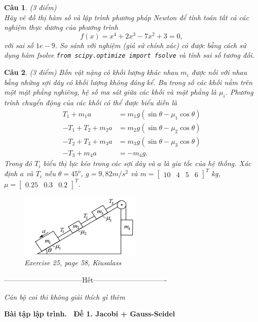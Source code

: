 \documentclass[11pt]{article}
\newtheorem{bt}{Câu}
\newcommand{\m}[1]{
	\begin{bmatrix}
		#1
	\end{bmatrix}
}
\begin{document}
\begin{bt}(3 điểm) \\
Hãy vẽ đồ thị hàm số và lập trình phương pháp Newton để tính toán tất cả các nghiệm thực dương của phương trình
\[ 
f(x) = x^4 + 2x^3 - 7x^2 + 3 = 0,
\]
với sai số $1e-9$. So sánh với nghiệm (giả sử chính xác) có được bằng cách sử dụng hàm fsolve \verb|from scipy.optimize import fsolve| và tính sai số tương đối.
\end{bt}


\begin{bt}(3 điểm)
	Bốn vật nặng có khối lượng khác nhau $m_i$ được nối với nhau bằng những sợi dây có khối lượng không đáng kể. Ba trong số các khối nằm trên một mặt phẳng nghiêng, hệ số ma sát giữa các khối và mặt phẳng là $\mu_i$. Phương trình chuyển động của các khối có thể được biểu diễn là
	\begin{align*}
		T_1 + m_1a &= m_1g (\sin \theta - \mu_1 \cos \theta) \\
		-T_1 + T_2 + m_2a &= m_2g (\sin \theta - \mu_2 \cos \theta) \\
		-T_2 + T_3 + m_3a &= m_3g (\sin \theta - \mu_3 \cos \theta) \\
		-T_3 + m_4a &= -m_4 g .
	\end{align*}
	Trong đó $T_i$ biểu thị lực kéo trong các sợi dây và $a$ là gia tốc của
	hệ thống. Xác định $a$ và $T_i$ nếu $\theta = 45^o$, $g = 9,82 m / s^2$ và
	$m = \m{10 & 4 & 5 & 6}^T$ kg, $\mu = \m{0.25 & 0.3 & 0.2}^T$.
	\begin{figure}[h!]
		\centering
		\includegraphics[width=0.4\linewidth]{mass_rope}
		\caption[]{Exercise 25, page 58, Kiusalass}
		\label{fig:massrope}
	\end{figure}
	
\end{bt}


\centerline{———————————Hết——————————-}

\vspace{1cm}
 {\it Cán bộ coi thi không giải thích gì thêm}\\

\cleardoublepage 


\begin{center}
	\textbf{ Bài tập lập trình.  \ Đề 1. Jacobi + Gauss-Seidel}
\end{center}
\end{document}
